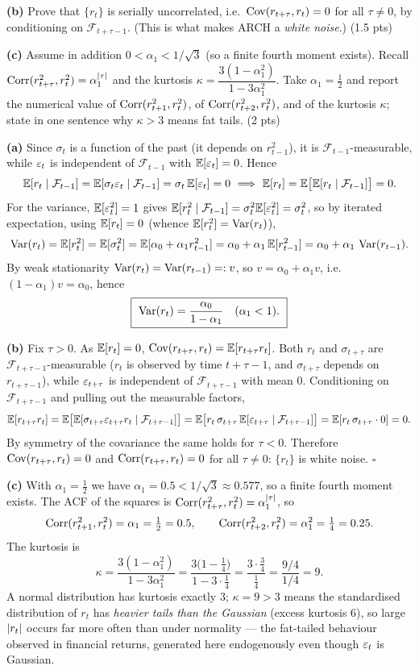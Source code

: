 \documentclass[11pt]{article}
\begin{document}
\textbf{(b)} Prove that $\{r_t\}$ is serially uncorrelated, i.e.\ $\operatorname{Cov}(r_{t+\tau},r_t)=0$ for all $\tau\neq0$, by conditioning on $\mathcal F_{t+\tau-1}$. (This is what makes ARCH a \emph{white noise}.) \hfill(1.5 pts)

\textbf{(c)} Assume in addition $0<\alpha_1<1/\sqrt3$ (so a finite fourth moment exists). Recall $\operatorname{Corr}(r_{t+\tau}^2,r_t^2)=\alpha_1^{\left\lvert \tau \right\rvert}$ and the kurtosis $\kappa=\dfrac{3(1-\alpha_1^2)}{1-3\alpha_1^2}$. Take $\alpha_1=\tfrac12$ and report the numerical value of $\operatorname{Corr}(r_{t+1}^2,r_t^2)$, of $\operatorname{Corr}(r_{t+2}^2,r_t^2)$, and of the kurtosis $\kappa$; state in one sentence why $\kappa>3$ means fat tails. \hfill(2 pts)
\statementend

\textbf{(a)} Since $\sigma_t$ is a function of the past (it depends on $r_{t-1}^2$), it is $\mathcal F_{t-1}$-measurable, while $\varepsilon_t$ is independent of $\mathcal F_{t-1}$ with $\mathbb{E}[\varepsilon_t]=0$. Hence
\[
\mathbb{E}[r_t\mid\mathcal F_{t-1}]=\mathbb{E}[\sigma_t\varepsilon_t\mid\mathcal F_{t-1}]
=\sigma_t\,\mathbb{E}[\varepsilon_t]=0
\ \Longrightarrow\
\mathbb{E}[r_t]=\mathbb{E}\bigl[\mathbb{E}[r_t\mid\mathcal F_{t-1}]\bigr]=0 .
\]
For the variance, $\mathbb{E}[\varepsilon_t^2]=1$ gives $\mathbb{E}[r_t^2\mid\mathcal F_{t-1}]=\sigma_t^2\mathbb{E}[\varepsilon_t^2]=\sigma_t^2$, so by iterated expectation, using $\mathbb{E}[r_t]=0$ (whence $\mathbb{E}[r_t^2]=\operatorname{Var}(r_t)$),
\[
\operatorname{Var}(r_t)=\mathbb{E}[r_t^2]=\mathbb{E}[\sigma_t^2]
=\mathbb{E}[\alpha_0+\alpha_1 r_{t-1}^2]
=\alpha_0+\alpha_1\,\mathbb{E}[r_{t-1}^2]
=\alpha_0+\alpha_1\,\operatorname{Var}(r_{t-1}).
\]
By weak stationarity $\operatorname{Var}(r_t)=\operatorname{Var}(r_{t-1})=:v$, so $v=\alpha_0+\alpha_1 v$, i.e.\ $(1-\alpha_1)v=\alpha_0$, hence
\[
\boxed{\ \Var(r_t)=\frac{\alpha_0}{1-\alpha_1}\quad(\alpha_1<1).\ }
\]

\textbf{(b)} Fix $\tau>0$. As $\mathbb{E}[r_t]=0$, $\operatorname{Cov}(r_{t+\tau},r_t)=\mathbb{E}[r_{t+\tau}r_t]$. Both $r_t$ and $\sigma_{t+\tau}$ are $\mathcal F_{t+\tau-1}$-measurable ($r_t$ is observed by time $t+\tau-1$, and $\sigma_{t+\tau}$ depends on $r_{t+\tau-1}$), while $\varepsilon_{t+\tau}$ is independent of $\mathcal F_{t+\tau-1}$ with mean $0$. Conditioning on $\mathcal F_{t+\tau-1}$ and pulling out the measurable factors,
\[
\mathbb{E}[r_{t+\tau}r_t]
=\mathbb{E}\bigl[\mathbb{E}[\sigma_{t+\tau}\varepsilon_{t+\tau}r_t\mid\mathcal F_{t+\tau-1}]\bigr]
=\mathbb{E}\bigl[r_t\,\sigma_{t+\tau}\,\mathbb{E}[\varepsilon_{t+\tau}\mid\mathcal F_{t+\tau-1}]\bigr]
=\mathbb{E}[r_t\,\sigma_{t+\tau}\cdot 0]=0 .
\]
By symmetry of the covariance the same holds for $\tau<0$. Therefore $\operatorname{Cov}(r_{t+\tau},r_t)=0$ and $\operatorname{Corr}(r_{t+\tau},r_t)=0$ for all $\tau\neq0$: $\{r_t\}$ is white noise. \hfill$\square$

\textbf{(c)} With $\alpha_1=\tfrac12$ we have $\alpha_1=0.5<1/\sqrt3\approx0.577$, so a finite fourth moment exists. The ACF of the squares is $\operatorname{Corr}(r_{t+\tau}^2,r_t^2)=\alpha_1^{\left\lvert \tau \right\rvert}$, so
\[
\operatorname{Corr}(r_{t+1}^2,r_t^2)=\alpha_1=\tfrac12=0.5,
\qquad
\operatorname{Corr}(r_{t+2}^2,r_t^2)=\alpha_1^2=\tfrac14=0.25 .
\]
The kurtosis is
\[
\kappa=\frac{3(1-\alpha_1^2)}{1-3\alpha_1^2}
=\frac{3\bigl(1-\tfrac14\bigr)}{1-3\cdot\tfrac14}
=\frac{3\cdot\tfrac34}{\tfrac14}
=\frac{9/4}{1/4}=9 .
\]
A normal distribution has kurtosis exactly $3$; $\kappa=9>3$ means the standardised distribution of $r_t$ has \emph{heavier tails than the Gaussian} (excess kurtosis $6$), so large $\left\lvert r_t \right\rvert$ occurs far more often than under normality --- the fat-tailed behaviour observed in financial returns, generated here endogenously even though $\varepsilon_t$ is Gaussian.
\end{document}
